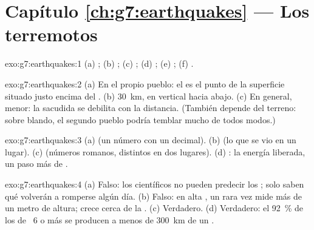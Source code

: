 \section*{Capítulo \ref{ch:g7:earthquakes} --- Los terremotos}

\begin{solution}{exo:g7:earthquakes:1}
(a) ; (b) ; (c) ; (d) ; (e) ;
(f) .
\end{solution}

\begin{solution}{exo:g7:earthquakes:2}
(a) En el propio pueblo: el  es el punto de la superficie situado
justo encima del . (b) \qty{30}{km}, en vertical hacia abajo.
(c) En general, menor: la sacudida se debilita con la distancia. (También
depende del terreno: sobre  blando, el segundo pueblo podría temblar
mucho de todos modos.)
\end{solution}

\begin{solution}{exo:g7:earthquakes:3}
(a)  (un número con un decimal). (b)  (lo que se vio en
un lugar). (c)  (números romanos, distintos en dos lugares).
(d) : la energía liberada, un paso más de .
\end{solution}

\begin{solution}{exo:g7:earthquakes:4}
(a) Falso: los científicos no pueden predecir los ; solo saben
qué  volverán a romperse algún día. (b) Falso: en alta , un
 rara vez mide más de un metro de altura; crece cerca de la .
(c) Verdadero. (d) Verdadero: el 92~\% de los  de ~6 o
más se producen a menos de \qty{300}{km} de un .
\end{solution}

